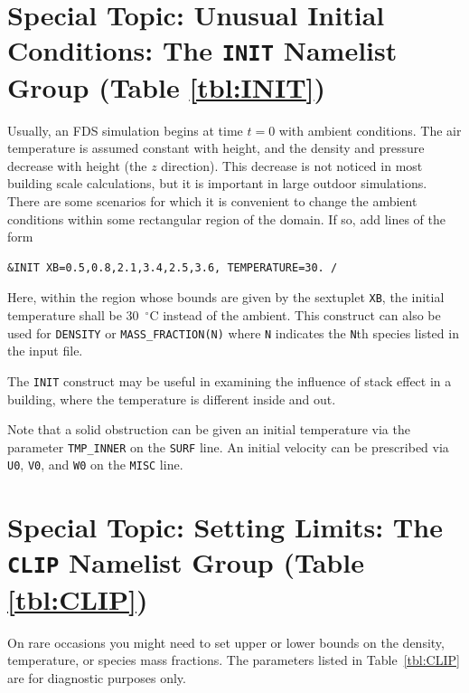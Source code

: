 \documentclass[11pt]{book}
\newcommand{\ct}{\tt\small}
\begin{document}
\section{Special Topic: Unusual Initial Conditions: The \texorpdfstring{{\tt INIT}}{INIT} Namelist Group (Table \ref{tbl:INIT})}
\label{info:INIT}

Usually, an FDS simulation begins at time $t=0$ with ambient conditions. The air temperature is
assumed constant with height, and the density and pressure decrease with height (the $z$ direction). This
decrease is not noticed in most building scale calculations, but it is important in large outdoor
simulations. There are some scenarios for which it is convenient to change the ambient conditions within some
rectangular region of the domain. If so, add lines of the form

\footnotesize
\begin{verbatim}
&INIT XB=0.5,0.8,2.1,3.4,2.5,3.6, TEMPERATURE=30. /
\end{verbatim}

\normalsize
Here, within the region whose bounds are given by the sextuplet {\ct XB},
the initial temperature shall be 30~$^\circ$C instead of the ambient.
This construct can also be used for {\ct DENSITY} or
{\ct MASS\_FRACTION(N)} where {\ct N} indicates the {\ct N}th species listed in the input file.

The {\ct INIT} construct may be useful in examining the influence of
stack effect  in a building, where the temperature
is different inside and out.

Note that a solid obstruction can be given an initial temperature via the
parameter {\ct TMP\_INNER} on the {\ct SURF} line. An initial velocity
can be prescribed via {\ct U0}, {\ct V0}, and {\ct W0} on the {\ct MISC} line.



\section{Special Topic: Setting Limits: The \texorpdfstring{{\tt CLIP}}{CLIP} Namelist Group (Table \ref{tbl:CLIP})}
\label{info:CLIP}

On rare occasions you might need to set upper or lower bounds on the density, temperature, or species mass fractions. The parameters
listed in Table~\ref{tbl:CLIP} are for diagnostic purposes only.
\end{document}
